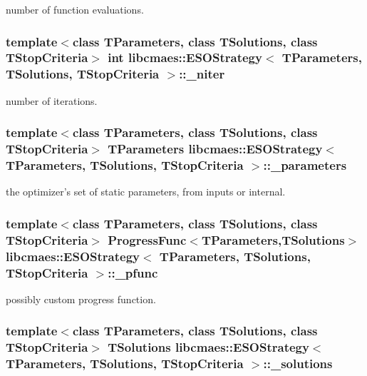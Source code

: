 number of function evaluations. \hypertarget{classlibcmaes_1_1ESOStrategy_aaf5c063558da34826ea1f976423ccfbb}{
\subsubsection[{\-\_\-niter}]{\setlength{\rightskip}{0pt plus 5cm}template$<$class T\-Parameters, class T\-Solutions, class T\-Stop\-Criteria$>$ int {\bf libcmaes\-::\-E\-S\-O\-Strategy}$<$ T\-Parameters, T\-Solutions, T\-Stop\-Criteria $>$\-::\-\_\-niter}}\label{classlibcmaes_1_1ESOStrategy_aaf5c063558da34826ea1f976423ccfbb}
number of iterations. \hypertarget{classlibcmaes_1_1ESOStrategy_a295e49238ceef8f11b3fb35296a8364a}{
\subsubsection[{\-\_\-parameters}]{\setlength{\rightskip}{0pt plus 5cm}template$<$class T\-Parameters, class T\-Solutions, class T\-Stop\-Criteria$>$ T\-Parameters {\bf libcmaes\-::\-E\-S\-O\-Strategy}$<$ T\-Parameters, T\-Solutions, T\-Stop\-Criteria $>$\-::\-\_\-parameters}}\label{classlibcmaes_1_1ESOStrategy_a295e49238ceef8f11b3fb35296a8364a}
the optimizer's set of static parameters, from inputs or internal. \hypertarget{classlibcmaes_1_1ESOStrategy_a25d597189596f434a2530887fddea189}{
\subsubsection[{\-\_\-pfunc}]{\setlength{\rightskip}{0pt plus 5cm}template$<$class T\-Parameters, class T\-Solutions, class T\-Stop\-Criteria$>$ Progress\-Func$<$T\-Parameters,T\-Solutions$>$ {\bf libcmaes\-::\-E\-S\-O\-Strategy}$<$ T\-Parameters, T\-Solutions, T\-Stop\-Criteria $>$\-::\-\_\-pfunc}}\label{classlibcmaes_1_1ESOStrategy_a25d597189596f434a2530887fddea189}
possibly custom progress function. \hypertarget{classlibcmaes_1_1ESOStrategy_a8fe0f8dc2201951e9e4ed2768b5a09ab}{
\subsubsection[{\-\_\-solutions}]{\setlength{\rightskip}{0pt plus 5cm}template$<$class T\-Parameters, class T\-Solutions, class T\-Stop\-Criteria$>$ T\-Solutions {\bf libcmaes\-::\-E\-S\-O\-Strategy}$<$ T\-Parameters, T\-Solutions, T\-Stop\-Criteria $>$\-::\-\_\-solutions}}\label{classlibcmaes_1_1ESOStrategy_a8fe0f8dc2201951e9e4ed2768b5a09ab}
